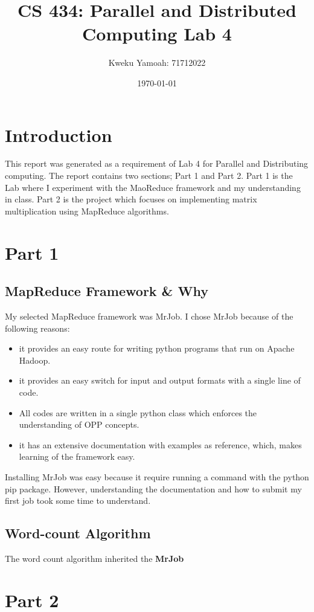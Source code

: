 \documentclass[12pt, a4paper, fleqn, titlepage]{article}
\title{\textbf{CS 434: Parallel and Distributed Computing Lab 4}}
\author{Kweku Yamoah: 71712022}
\date{\today}
\begin{document}
\maketitle
\section*{Introduction}
    This report was generated as a requirement of Lab 4 for Parallel and Distributing computing. The report contains two sections; Part 1 and Part 2. Part 1 is the Lab where I experiment with the MaoReduce framework and my understanding in class. Part 2 is the project which focuses on implementing matrix multiplication using MapReduce algorithms. 
\section*{Part 1}
    \subsection*{MapReduce Framework \& Why}
    My selected MapReduce framework was MrJob. I chose MrJob because of the following reasons:
        \begin{itemize}
            \item it provides an easy route for writing python programs that run on Apache Hadoop.
            \item it provides an easy switch for input and output formats with a single line of code.
            \item All codes are written in a single python class which enforces the understanding of OPP concepts.
            \item it has an extensive documentation with examples as reference, which, makes learning of the framework easy.
        \end{itemize}
    Installing MrJob was easy because it require running a command with the python pip package. However, understanding the documentation and how to submit my first job took some time to understand.

    \subsection*{Word-count Algorithm}
        The word count algorithm inherited the \textbf{MrJob}

\section*{Part 2}
\end{document}
